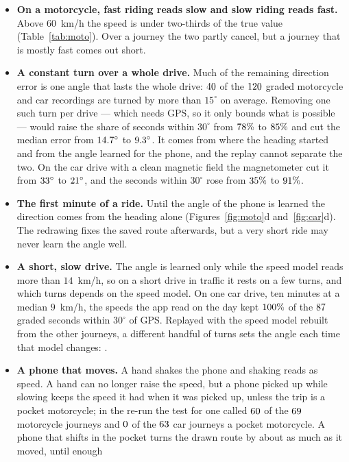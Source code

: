 \documentclass[11pt]{article}
\newcommand{\dg}{^\circ}
\begin{document}
\begin{itemize}
\item \textbf{On a motorcycle, fast riding reads slow and slow riding reads fast.} Above $60$~km/h the
speed is under two-thirds of the true value (Table~\ref{tab:moto}). Over a journey the two partly
cancel, but a journey that is mostly fast comes out short.
\item \textbf{A constant turn over a whole drive.} Much of the remaining direction error is one angle that
lasts the whole drive: $40$ of the $120$ graded motorcycle and car recordings are turned by more than
$15\dg$ on average. Removing one such turn per drive --- which needs GPS, so it only bounds what is
possible --- would raise the share of seconds within $30\dg$ from $78\%$ to $85\%$ and cut the median
error from $\nTurnMedNow\dg$ to $\nTurnMedFixed\dg$. It comes from where the heading started and from the angle learned for
the phone, and the replay cannot separate the two. On the car drive with a clean magnetic field the
magnetometer cut it from $\nMagOffD\dg$ to $\nMagOffE\dg$, and the seconds within $30\dg$ rose from $35\%$ to $91\%$.
\item \textbf{The first minute of a ride.} Until the angle of the phone is learned the direction comes
from the heading alone (Figures~\ref{fig:moto}d and~\ref{fig:car}d). The redrawing fixes the saved route afterwards,
but a very short ride may never learn the angle well.
\item \textbf{A short, slow drive.} The angle is learned only while the speed model reads more than
$14$~km/h, so on a short drive in traffic it rests on a few turns, and which turns depends on the speed
model. On one car drive, ten minutes at a median $9$~km/h, the speeds the app read on the day kept
$100\%$ of the $87$ graded seconds within $30\dg$ of GPS. Replayed with the speed model rebuilt from the
other journeys, a different handful of turns sets the angle each time that model changes:
\nSlowReplayTxt{}.
\item \textbf{A phone that moves.} A hand shakes the phone and shaking reads as speed. A hand can no
longer raise the speed, but a phone picked up while slowing keeps the speed it had when it was picked
up, unless the trip is a pocket motorcycle; in the re-run the test for one called $60$ of the
$69$ motorcycle journeys and $0$ of the $63$ car journeys a pocket motorcycle. A phone that shifts in the pocket turns the drawn route by about as much as it moved, until enough

\end{itemize}
\end{document}
